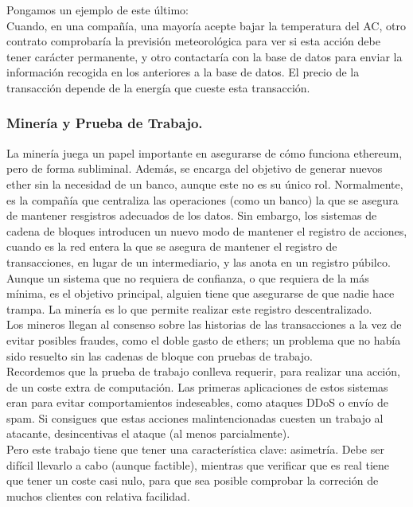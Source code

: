 \documentclass[11pt,a4paper]{article}
\begin{document}
Pongamos un  ejemplo de este último:\\

Cuando, en una compañía, una mayoría acepte bajar la temperatura del AC, otro contrato comprobaría la previsión meteorológica para ver si esta acción debe tener carácter permanente, y otro contactaría con la base de datos para enviar la información recogida en los anteriores a la base de datos. El precio de la transacción depende de la energía que cueste esta transacción.

\subsubsection{Minería y Prueba de Trabajo.}

La minería juega un papel importante en asegurarse de cómo funciona ethereum, pero de forma subliminal. Además, se encarga del objetivo de generar nuevos ether sin la necesidad de un banco, aunque este no es su único rol. Normalmente, es la compañía que centraliza las operaciones (como un banco) la que se asegura de mantener resgistros adecuados de los datos. Sin embargo, los sistemas de cadena de bloques introducen un nuevo modo de mantener el registro de acciones, cuando es la red entera la que se asegura de mantener el registro de transacciones, en lugar de un intermediario, y las anota en un registro púbilco.\\ 

Aunque un sistema que no requiera de confianza, o que requiera de la más mínima, es el objetivo principal, alguien tiene que asegurarse de que nadie hace trampa. La minería es lo que permite realizar este registro descentralizado. \\

Los mineros llegan al consenso sobre las historias de las transacciones a la vez de evitar posibles fraudes, como el doble gasto de ethers; un problema que no había sido resuelto sin las cadenas de bloque con pruebas de trabajo.\\

Recordemos que la prueba de trabajo conlleva requerir, para realizar una acción, de un coste extra de computación. Las primeras aplicaciones de estos sistemas eran para evitar comportamientos indeseables, como ataques DDoS o envío de spam. Si consigues que estas acciones malintencionadas cuesten un trabajo al atacante, desincentivas el ataque (al menos parcialmente).\\

Pero este trabajo tiene que tener una característica clave: asimetría. Debe ser difícil llevarlo a cabo (aunque factible), mientras que verificar que es real tiene que tener un coste casi nulo, para que sea posible comprobar la correción de muchos clientes con relativa facilidad.\\
\end{document}
